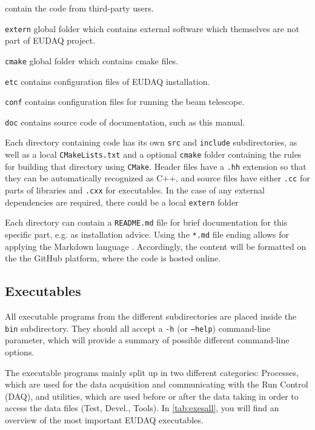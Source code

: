 \begin{myitemize}
\begin{myitemize}
  contain the code from third-party users.
  \end{myitemize}
\item \texttt{extern}
  global folder which contains external software which themselves are not part of EUDAQ project.
\item \texttt{cmake}
  global folder which contains cmake files.
\item \texttt{etc}
  contains configuration files of EUDAQ installation.
\item \texttt{conf}
  contains configuration files for running the beam telescope.
\item \texttt{doc}
  contains source code of documentation, such as this manual.
\end{myitemize}

Each directory containing code has its own \texttt{src} and \texttt{include} subdirectories,
as well as a local \texttt{CMakeLists.txt} and a optional \texttt{cmake} folder containing the rules
for building that directory using \texttt{CMake}.
Header files have a \texttt{.hh} extension so that they can be automatically recognized as C++,
and source files have either \texttt{.cc} for parts of libraries and \texttt{.cxx} for executables.
In the case of any external dependencies are required, there could be a local \texttt{extern} folder

Each directory can contain a \texttt{README.md} file for brief documentation for this specific part, e.g.  
as installation advice. 
Using the \texttt{*.md} file ending allows for applying the Markdown language \cite{markdownWWW}. 
Accordingly, the content will be formatted on the the GitHub platform, where the code is hosted online.

\subsection{Executables}
All executable programs from the different subdirectories are placed inside the \texttt{bin} subdirectory. They should all accept a \texttt{-h} (or \texttt{--help}) command-line parameter, which will provide a summary of possible different command-line options.

The executable programs mainly split up in two different categories: Processes, which are used for the data acquisition and communicating with the Run Control (DAQ), and utilities, which are used before or after the data taking in order to access the data files (Test, Devel., Tools).
In \autoref{tab:exesall}, you will find an overview of the most important EUDAQ executables.

